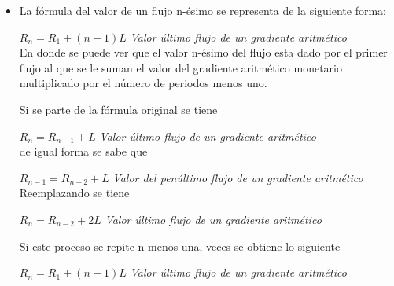 \begin{itemize}
 \item La fórmula del valor de un flujo n-ésimo se representa de la siguiente forma:

       \vspace{4mm}

       $R_{n}=R_{1} + (n-1)L$ \hspace{35 pt} \textit{Valor último flujo de un gradiente aritmético}\\

       En donde se puede ver que el valor n-ésimo del flujo esta dado por el primer flujo al que se le suman el valor del gradiente aritmético monetario multiplicado por el número de periodos menos uno.

       \vspace{4mm}

       Si se parte de la fórmula original se tiene

       \vspace{4mm}

       $R_{n}=R_{n-1} + L$ \hspace{55 pt} \textit{Valor último flujo de un gradiente aritmético}\\

       de igual forma se sabe que

       \vspace{4mm}

       $R_{n-1}=R_{n-2} +L$ \hspace{45 pt} \textit{Valor del penúltimo flujo de un gradiente aritmético}\\

       Reemplazando se tiene

       \vspace{4mm}

       $R_{n}=R_{n-2} +2L$ \hspace{50 pt} \textit{Valor último flujo de un gradiente aritmético}\\

       \vspace{4mm}

       Si este proceso se repite n menos una, veces se obtiene lo siguiente

       \vspace{4mm}

       $R_{n}=R_{1} + (n-1)L$ \hspace{37 pt} \textit{Valor último flujo de un gradiente aritmético}\\



\end{itemize}
